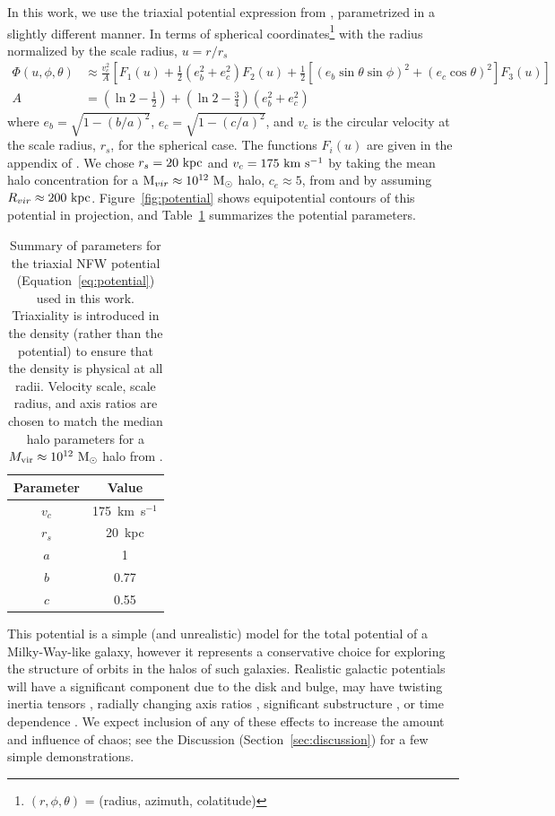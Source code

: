 \documentclass[letterpaper,12pt,preprint]{aastex}
\newcommand{\msun}{\ensuremath{\mathrm{M}_\odot}}
\begin{document}
In this work, we use the triaxial potential expression from \citet{leesuto03}, parametrized in a slightly different manner. In terms of spherical coordinates\footnote{$(r,\phi,\theta)$ = (radius, azimuth, colatitude)} with the radius normalized by the scale radius, $u = r/r_s$
\begin{align}
	\Phi(u,\phi,\theta) &\approx \frac{v_c^2}{A}\left[F_1(u) + \frac{1}{2}(e_b^2 + e_c^2)F_2(u) + \frac{1}{2} [(e_b\sin\theta \sin\phi)^2 + (e_c\cos\theta)^2] F_3(u) \right]\label{eq:potential}\\
	A &= \left(\ln2 - \frac{1}{2}\right) + \left(\ln2-\frac{3}{4}\right) (e_b^2 + e_c^2)
\end{align}
where $e_b = \sqrt{1 - (b/a)^2}$, $e_c = \sqrt{1 - (c/a)^2}$, and $v_c$ is the circular velocity at the scale radius, $r_s$, for the spherical case. The functions $F_i(u)$ are given in the appendix of \cite{leesuto03}. We chose $r_s=20~{\rm kpc}$ and $v_c = 175~{\rm km}~{\rm s}^{-1}$ by taking the mean halo concentration for a ${\rm M}_{vir} \approx 10^{12}~\msun$ halo, $c_e\approx5$, from \cite{jing02} and by assuming $R_{vir}\approx200~{\rm kpc}$. Figure~\ref{fig:potential} shows equipotential contours of this potential in projection, and Table~\ref{tbl:potential} summarizes the potential parameters.

\begin{table}[ht]
\begin{center}
	\begin{tabular}{ c  c }
	         Parameter & Value\\\toprule
		$v_c$ & 175~km~s$^{-1}$\\
		$r_s$ & 20~kpc\\
		$a$ & 1\\
		$b$ & 0.77\\
		$c$ & 0.55\\
		\bottomrule
		\end{tabular}
	\caption{Summary of parameters for the triaxial NFW potential (Equation~\ref{eq:potential}) used in this work. Triaxiality is introduced in the density (rather than the potential) to ensure that the density is physical at all radii. Velocity scale, scale radius, and axis ratios are chosen to match the median halo parameters for a $M_{\rm vir} \approx 10^{12}~\msun$ halo from \citep{jing02}. \label{tbl:potential}}
\end{center}
\end{table}

This potential is a simple (and unrealistic) model for the total potential of a Milky-Way-like galaxy, however it represents a conservative choice for exploring the structure of orbits in the halos of such galaxies. Realistic galactic potentials will have a significant component due to the disk and bulge, may have twisting inertia tensors \citep{romanowsky98}, radially changing axis ratios \citep[e.g.,][]{kazantzidis04,debattista08,veraciro11,butsky15}, significant substructure \citep{moore98,zemp09}, or time dependence \citep[either from bulk rotation, mass growth, mergers, etc.; see, e.g.,][]{bailin05}. We expect inclusion of any of these effects to increase the amount and influence of chaos; see the Discussion (Section~\ref{sec:discussion}) for a few simple demonstrations. 
\end{document}
